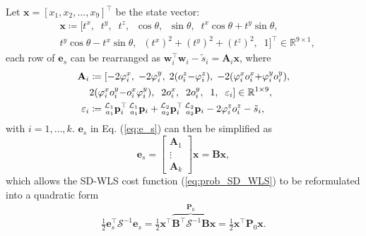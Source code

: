 \documentclass[journal]{IEEEtran}
\def\R{\mathbb{R}}
\def\CovMatS{\mathcal{S}}
\def\LocPosHost{\prescript{\mathcal{L}_1}{a_1}{\mathbf{p}}} %
\def\LocPosTarg{\prescript{\mathcal{L}_2}{a_2}{\mathbf{p}}} %
\begin{document}
Let $\mathbf{x} = [x_1,x_2,\dots,x_9]^\top$ be the state vector:
\begin{equation} \label{eq:x_state_vector}
\begin{aligned}
    &\mathbf{x} \coloneqq [
    t^x, \;\;
    t^y, \;\;
    t^z, \;\; 
    \cos{\theta},\;\; 
    \sin{\theta},\;\; 
    t^x \cos{\theta} + t^y \sin{\theta}, \\
    &t^y \cos{\theta} - t^x \sin{\theta}, \;\;
    (t^x)^2 + (t^y)^2 + (t^z)^2, \;\; 
    1]^\top \in \R^{9 \times 1},
\end{aligned}
\end{equation}
each row of $\mathbf{e}_s$ can be rearranged as $\mathbf{w}_i^\top \mathbf{w}_i - \tilde{s}_i = \mathbf{A}_i \mathbf{x}$, where
\textcolor{black}{
\begin{equation}
\begin{aligned} \label{eq:Ai_row}
    \mathbf{A}_i &\coloneqq [
    {-}2\varphi^x_i, \;
    {-}2\varphi^y_i, \;
    2(o^z_i {-} \varphi^z_i), \;
    {-}2(\varphi^x_i o^x_i {+} \varphi^y_i  o^y_i), \\
    &2(\varphi^x_i  o^y_i {-} o^x_i \varphi^y_i), \;\;
    2  o^x_i, \;\;
    2  o^y_i, \;\;
    1, \;\;
    \varepsilon_i] \in \R^{1 \times 9},\\
    \varepsilon_i &\coloneqq 
    \LocPosHost_i^\top \LocPosHost_i + \LocPosTarg_i^\top \LocPosTarg_i - 2\varphi^z_i o^z_i - \tilde{s}_i,\\
\end{aligned}
\end{equation}
}
with $i = 1,\dots,k$.
$\mathbf{e}_s$ in Eq. (\ref{eq:e_s}) can then be simplified as
\begin{equation}
    \mathbf{e}_s = 
        \begin{bmatrix}
            \mathbf{A}_1\\
            \vdots\\
            \mathbf{A}_k
        \end{bmatrix}
        \mathbf{x}
    = \mathbf{B} \mathbf{x},
\end{equation}
which allows the SD-WLS cost function (\ref{eq:prob_SD_WLS}) to be reformulated into a quadratic form
\begin{equation}
\begin{aligned}
    \frac{1}{2} \mathbf{e}_s^\top \CovMatS^{-1} \mathbf{e}_s = 
    \frac{1}{2} \mathbf{x}^\top 
    \overbrace{
    \mathbf{B}^\top \CovMatS^{-1} \mathbf{B}
    }^{\mathbf{P}_0}
    \mathbf{x} = \frac{1}{2} \mathbf{x}^\top \mathbf{P}_0 \mathbf{x}.
\end{aligned}
\end{equation}
\end{document}
